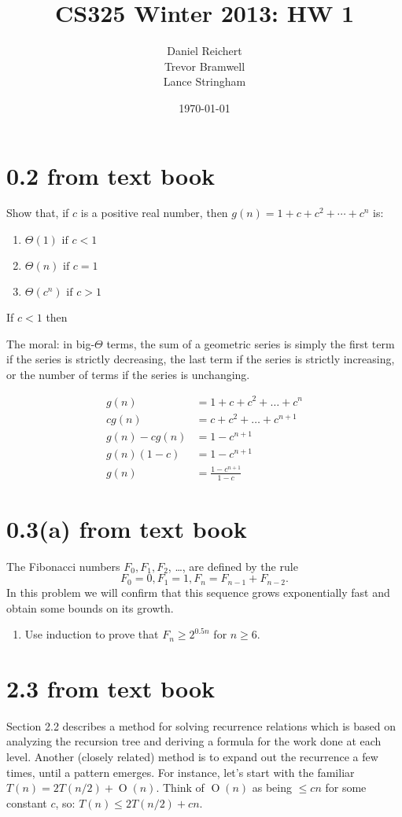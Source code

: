 \documentclass[12pt]{article}
\title{CS325 Winter 2013: HW 1}
\author{
    Daniel Reichert \\
    Trevor Bramwell \\
    Lance Stringham
}
\date{\today}
\newcommand{\BigO}[1]{\ensuremath{\operatorname{O}\left(#1\right)}}
\begin{document}
\maketitle

\section*{0.2 from text book}
Show that, if $c$ is a positive real number, then $g(n)=1+c+c^2+\cdots+c^n$ is:

\begin{enumerate}
\item $\Theta(1) \text{ if } c < 1$
\item $\Theta(n) \text{ if } c = 1$
\item $\Theta(c^n) \text{ if } c > 1$
\end{enumerate}

If $ c < 1 $ then 

The moral: in big-$\Theta$ terms, the sum of a geometric series is simply the
first term if the series is
strictly decreasing, the last term if the series is strictly increasing,
or the number of terms if the
series is unchanging.

\begin{align*}
    g(n) &= 1 + c + c^2 + \dots + c^{n} \\
    cg(n) &= c + c^2 + \dots + c^{n+1} \\
    g(n) - cg(n) &= 1 - c^{n+1} \\
    g(n)(1 - c) &= 1 - c^{n+1} \\
    g(n) &= \frac{1 - c^{n+1}}{1 - c}
\end{align*}

\section*{0.3(a) from text book}

The Fibonacci numbers $F_0, F_1, F_2$, \ldots, are defined by the rule
\[ F_0 = 0, F_1 = 1, F_n = F_{n - 1} + F_{n - 2}. \]
In this problem we will confirm that this sequence grows exponentially
fast and obtain some
bounds on its growth.
\begin{enumerate}
\item Use induction to prove that $F_n \geq 2^{0.5n}$ for $n \geq 6$.
\end{enumerate}

\section*{2.3 from text book}
Section 2.2 describes a method for solving recurrence relations which is
based on analyzing the recursion tree and deriving a formula for the
work done at each level.  Another (closely related) method is to expand
out the recurrence a few times, until a pattern emerges. For instance,
let’s start with the familiar $T(n) = 2T(n/2) + \BigO{n}$. Think of
$\BigO{n}$ as being $\leq cn$ for some constant $c$,
so: $T(n) \leq 2T(n/2) + cn$. 
\end{document}
